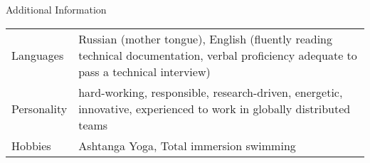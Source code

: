 \documentclass{resume} %
\begin{document}

\begin{rSection}{Additional Information}

\begin{table}[h]
\begin{tabularx}{\textwidth}{l X}
Languages & Russian (mother tongue), English (fluently reading technical documentation, verbal
proficiency adequate to pass a technical interview) \\
Personality & hard-working, responsible, research-driven, energetic, innovative, experienced to
work in globally distributed teams \\
Hobbies & Ashtanga Yoga, Total immersion swimming
\end{tabularx}
\end{table}

\end{rSection}
\end{document}
